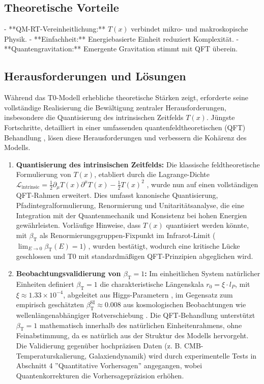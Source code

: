 \documentclass[12pt,a4paper]{article}
\newcommand{\Tfield}{T(x)}
\newcommand{\betaT}{\beta_{\text{T}}}
\newcommand{\calL}{\mathcal{L}}
\begin{document}
	\subsection{Theoretische Vorteile}
	- **QM-RT-Vereinheitlichung:** \(\Tfield\) verbindet mikro- und makroskopische Physik.
	- **Einfachheit:** Energiebasierte Einheit reduziert Komplexität.
	- **Quantengravitation:** Emergente Gravitation stimmt mit QFT überein.
	
	\subsection{Herausforderungen und Lösungen}
	\label{subsec:challenges}
	
	Während das T0-Modell erhebliche theoretische Stärken zeigt, erforderte seine vollständige Realisierung die Bewältigung zentraler Herausforderungen, insbesondere die Quantisierung des intrinsischen Zeitfelds \(\Tfield\). Jüngste Fortschritte, detailliert in einer umfassenden quantenfeldtheoretischen (QFT) Behandlung \cite{pascher_qft_2025}, lösen diese Herausforderungen und verbessern die Kohärenz des Modells.
	
	\begin{enumerate}
		\item \textbf{Quantisierung des intrinsischen Zeitfelds:} Die klassische feldtheoretische Formulierung von \(\Tfield\), etabliert durch die Lagrange-Dichte \(\calL_{\text{intrinsic}} = \frac{1}{2}\partial_{\mu}\Tfield\partial^{\mu}\Tfield - \frac{1}{2}\Tfield^2\) \cite{pascher_lagrange_2025}, wurde nun auf einen vollständigen QFT-Rahmen erweitert. Dies umfasst kanonische Quantisierung, Pfadintegralformulierung, Renormierung und Unitaritätsanalyse, die eine Integration mit der Quantenmechanik und Konsistenz bei hohen Energien gewährleisten. Vorläufige Hinweise, dass \(\Tfield\) quantisiert werden könnte, mit \(\betaT\) als Renormierungsgruppen-Fixpunkt im Infrarot-Limit (\(\lim_{E \to 0} \betaT(E) = 1\)) \cite{pascher_alphabeta_2025}, wurden bestätigt, wodurch eine kritische Lücke geschlossen und T0 mit standardmäßigen QFT-Prinzipien abgeglichen wird.
		
		\item \textbf{Beobachtungsvalidierung von \(\betaT = 1\):} Im einheitlichen System natürlicher Einheiten definiert \(\betaT = 1\) die charakteristische Längenskala \(r_0 = \xi \cdot l_P\), mit \(\xi \approx 1.33 \times 10^{-4}\), abgeleitet aus Higgs-Parametern \cite{pascher_params_2025, pascher_alphabeta_2025}, im Gegensatz zum empirisch geschätzten \(\betaT^{\text{SI}} \approx 0.008\) aus kosmologischen Beobachtungen wie wellenlängenabhängiger Rotverschiebung \cite{pascher_messdifferenzen_2025}. Die QFT-Behandlung unterstützt \(\betaT = 1\) mathematisch innerhalb des natürlichen Einheitenrahmens, ohne Feinabstimmung, da es natürlich aus der Struktur des Modells hervorgeht. Die Validierung gegenüber hochpräzisen Daten (z. B. CMB-Temperaturskalierung, Galaxiendynamik) wird durch experimentelle Tests in Abschnitt 4 ''Quantitative Vorhersagen'' angegangen, wobei Quantenkorrekturen die Vorhersagepräzision erhöhen.
	\end{enumerate}
	
\end{document}
